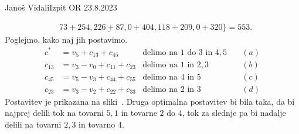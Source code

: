 \begin{naloga}{Janoš Vidali}{Izpit OR 23.8.2023}
\begin{odgovor}
\begin{enumerate}[(a)]
\begin{align*}
&{} 73+254, \underline{226+87}, 0+404, 118+209, 0+320\} = 553 .
\end{align*}
Poglejmo, kako naj jih postavimo.
\begin{align*}
c^* &= v_5 + c_{13} + c_{45} & \text{delimo na $1$ do $3$ in $4, 5$} &\quad (a) \\
c_{13} &= v_3 - v_0 + c_{11} + c_{23} & \text{delimo na $1$ in $2, 3$} &\quad (b) \\
c_{45} &= v_5 - v_3 + c_{44} + c_{55} & \text{delimo na $4$ in $5$} &\quad (c) \\
c_{23} &= v_3 - v_2 + c_{22} + c_{33} & \text{delimo na $2$ in $3$} &\quad (d)
\end{align*}
%
Postavitev je prikazana na sliki~.
Druga optimalna postavitev bi bila taka,
da bi najprej delili tok na tovarni $5, 1$ in tovarne $2$ do $4$,
tok za slednje pa bi nadalje delili na tovarni $2, 3$ in tovarno $4$.
\begin{slika}
\end{slika}
\end{enumerate}
\end{odgovor}
\end{naloga}
